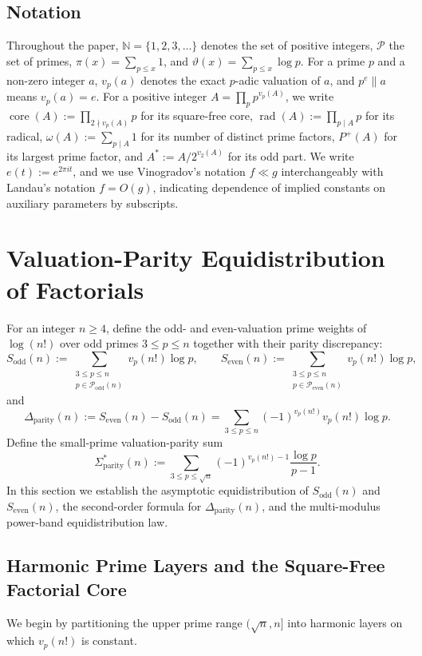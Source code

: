 \documentclass[11pt,reqno]{amsart}
\theoremstyle{remark}
\numberwithin{equation}{section}
\newcommand{\N}{\mathbb{N}}
\newcommand{\Pset}{\mathcal{P}}
\newcommand{\Podd}{\mathcal{P}_{\mathrm{odd}}}
\newcommand{\Peven}{\mathcal{P}_{\mathrm{even}}}
\newcommand{\Sodd}{S_{\mathrm{odd}}}
\newcommand{\Seven}{S_{\mathrm{even}}}
\newcommand{\Dparity}{\Delta_{\mathrm{parity}}}
\newcommand{\Sparitys}{\Sigma_{\mathrm{parity}}^*}
\DeclareMathOperator{\core}{core}
\DeclareMathOperator{\rad}{rad}
\begin{document}
\subsection{Notation}
Throughout the paper, $\N = \{1, 2, 3, \dots\}$ denotes the set of positive integers, $\Pset$ the set of primes, $\pi(x) = \sum_{p \le x} 1$, and $\vartheta(x) = \sum_{p \le x} \log p$. For a prime $p$ and a non-zero integer $a$, $v_p(a)$ denotes the exact $p$-adic valuation of $a$, and $p^e \parallel a$ means $v_p(a) = e$. For a positive integer $A = \prod_p p^{v_p(A)}$, we write $\core(A) := \prod_{2 \nmid v_p(A)} p$ for its square-free core, $\rad(A) := \prod_{p \mid A} p$ for its radical, $\omega(A) := \sum_{p \mid A} 1$ for its number of distinct prime factors, $P^+(A)$ for its largest prime factor, and $A^* := A / 2^{v_2(A)}$ for its odd part. We write $e(t) := e^{2\pi i t}$, and we use Vinogradov's notation $f \ll g$ interchangeably with Landau's notation $f = O(g)$, indicating dependence of implied constants on auxiliary parameters by subscripts.

\section{Valuation-Parity Equidistribution of Factorials}\label{sec:2}

For an integer $n \ge 4$, define the odd- and even-valuation prime weights of $\log(n!)$ over odd primes $3 \le p \le n$ together with their parity discrepancy:
\begin{equation}\label{eq:2.1}
\Sodd(n) := \sum_{\substack{3 \le p \le n \\ p \in \Podd(n)}} v_p(n!)\log p, \qquad \Seven(n) := \sum_{\substack{3 \le p \le n \\ p \in \Peven(n)}} v_p(n!)\log p,
\end{equation}
and
\begin{equation}\label{eq:2.2}
\Dparity(n) := \Seven(n) - \Sodd(n) = \sum_{3 \le p \le n} (-1)^{v_p(n!)} v_p(n!)\log p.
\end{equation}
Define the small-prime valuation-parity sum
\begin{equation}\label{eq:2.3}
\Sparitys(n) := \sum_{3 \le p \le \sqrt{n}} (-1)^{v_p(n!)-1} \frac{\log p}{p - 1}.
\end{equation}
In this section we establish the asymptotic equidistribution of $\Sodd(n)$ and $\Seven(n)$, the second-order formula for $\Dparity(n)$, and the multi-modulus power-band equidistribution law.

\subsection{Harmonic Prime Layers and the Square-Free Factorial Core}
We begin by partitioning the upper prime range $(\sqrt{n}, n]$ into harmonic layers on which $v_p(n!)$ is constant.
\end{document}

